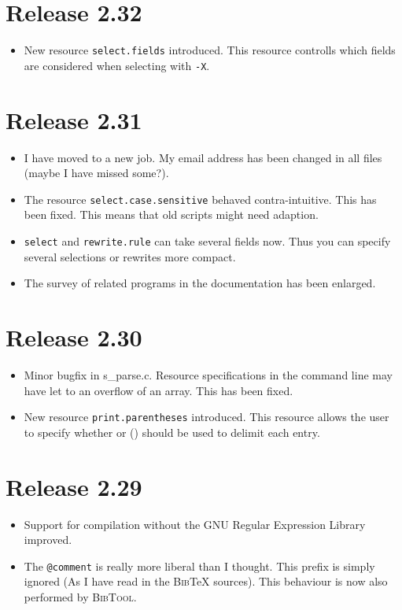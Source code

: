 \documentclass[11pt,a4paper]{scrartcl}
\newcommand\Arg[1]{\texttt{#1}}
\newcommand\rsc[1]{\texttt{#1}}
\newcommand\File[1]{\textsf{#1}}
\newcommand\BibTool{\textsc{BibTool}}
\newcommand\BibTeX{\textsc{Bib}\TeX}
\newenvironment{Release}[2]{\section*{Release #1}\begin{itemize}}{\end{itemize}}
\newenvironment{Fix}[1]{\item }{}
\newenvironment{New}[1]{\item }{}
\newenvironment{Doc}[1]{\item }{}
\newenvironment{Update}[1]{\item }{}
\begin{document}
 \begin{Release}{2.32}{}
  \begin{New}{gene}
    New resource \rsc{select.fields} introduced. This resource
    controlls which fields are considered when selecting with
    \Arg{-X}.
  \end{New}
 \end{Release}

 \begin{Release}{2.31}{}
  \begin{Update}{gene}
    I have moved to a new job. My email address has been changed in
    all files (maybe I have missed some?).
  \end{Update}
  \begin{Fix}{gene}
    The resource \rsc{select.case.sensitive} behaved
    contra-intuitive. This has been fixed. This means that old scripts
    might need adaption.
  \end{Fix}
  \begin{Update}{gene}
    \rsc{select} and 
\rsc{rewrite.rule} can take several
    fields now. Thus you can specify several selections or rewrites
    more compact.
  \end{Update}
  \begin{Doc}{gene}
    The survey of related programs in the documentation has been
    enlarged.
  \end{Doc}
 \end{Release}

 \begin{Release}{2.30}{}
  \begin{Fix}{gene}
    Minor bugfix in \File{s\_parse.c}. Resource specifications in
    the command line may have let to an overflow of an array. This has
    been fixed.
  \end{Fix}
  \begin{New}{gene}
    New resource \rsc{print.parentheses} introduced. This
    resource allows the user to specify whether {} or () should be
    used to delimit each entry.
  \end{New}
 \end{Release}

 \begin{Release}{2.29}{}
  \begin{Update}{gene}
    Support for compilation without the GNU Regular Expression Library
    improved.
  \end{Update}
  \begin{Update}{gene}
    The \verb|@comment| is really more liberal than I thought. This
    prefix is simply ignored (As I have read in the \BibTeX{}
    sources). This behaviour is now also performed by \BibTool{}.
  \end{Update}
 \end{Release}
\end{document}
